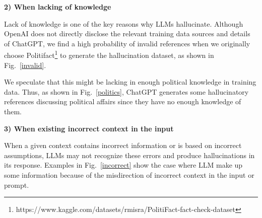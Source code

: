 \documentclass{article} %
\begin{document}
\textbf{2) When lacking of knowledge}

Lack of knowledge is one of the key reasons why LLMs hallucinate. Although OpenAI does not directly disclose the relevant training data sources and details of ChatGPT, we find a high probability of invalid references when we originally choose Politifact\footnote{https://www.kaggle.com/datasets/rmisra/PolitiFact-fact-check-dataset} to generate the hallucination dataset, as shown in Fig.~\ref{invalid}.

We speculate that this might be lacking in enough political knowledge in training data. 
Thus, as shown in Fig.~\ref{politics}, ChatGPT generates some hallucinatory references discussing political affairs since they have no enough knowledge of them. 

\textbf{3) When existing incorrect context in the input}

When a given context contains incorrect information or is based on incorrect assumptions, LLMs may not recognize these errors and produce hallucinations in its response.
Examples in Fig.~\ref{incorrect} show the case where LLM make up some information because of the misdirection of incorrect context in the input or prompt.
\end{document}
